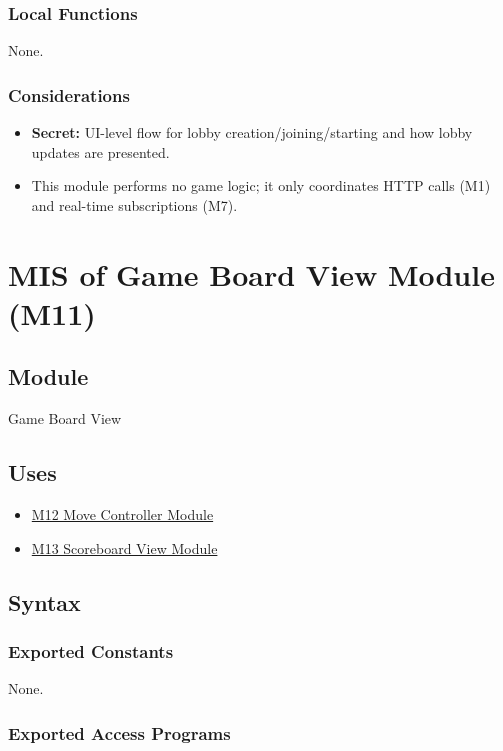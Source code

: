\documentclass[12pt, titlepage]{article}
\begin{document}
\subsubsection{Local Functions}
None.

\subsubsection{Considerations}
\begin{itemize}
    \item \textbf{Secret:} UI-level flow for lobby creation/joining/starting and how lobby updates are presented.
    \item This module performs no game logic; it only coordinates HTTP calls (M1) and real-time subscriptions (M7).
\end{itemize}


\newpage
\section{MIS of Game Board View Module (M11)}\label{sec:game-board-view-module}

\subsection{Module}
Game Board View

\subsection{Uses}
\begin{itemize}
    \item \hyperref[sec:move-controller-module]{M12 Move Controller Module}
    \item \hyperref[sec:scoreboard-view-module]{M13 Scoreboard View Module}
\end{itemize}

\subsection{Syntax}

\subsubsection{Exported Constants}
None.

\subsubsection{Exported Access Programs}
\end{document}
